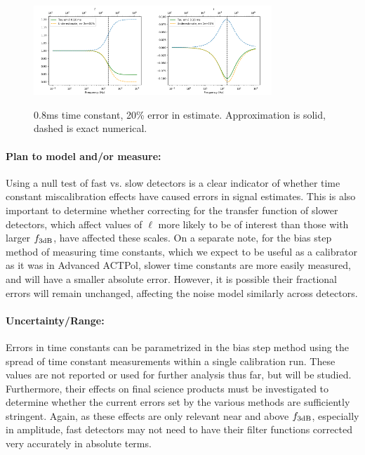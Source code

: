 \begin{figure}[h!]
\centering
\includegraphics[width=0.4\textwidth]{figures/tau_ampl_error_800us_20pError.png}\quad\includegraphics[width=0.4\textwidth]{figures/tau_phase_error_800us_20pError.png}
\caption{0.8ms time constant, 20\% error in estimate. Approximation is solid, dashed is exact numerical.}
\label{tau_miscal}
\end{figure}

\paragraph{Plan to model and/or measure:}
Using a null test of fast vs. slow detectors is a clear indicator of whether time constant miscalibration effects have caused errors in signal estimates. This is also important to determine whether correcting for the transfer function of slower detectors, which affect values of $\ell$ more likely to be of interest than those with larger $f_{\mbox{\scriptsize 3dB}}$, have affected these scales. On a separate note, for the bias step method of measuring time constants, which we expect to be useful as a calibrator as it was in Advanced ACTPol, slower time constants are more easily measured, and will have a smaller absolute error. However, it is possible their fractional errors will remain unchanged, affecting the noise model similarly across detectors.

\paragraph{Uncertainty/Range:}
Errors in time constants can be parametrized in the bias step method using the spread of time constant measurements within a single calibration run. These values are not reported or used for further analysis thus far, but will be studied. Furthermore, their effects on final science products must be investigated to determine whether the current errors set by the various methods are sufficiently stringent. Again, as these effects are only relevant near and above $f_{\mbox{\scriptsize 3dB}}$, especially in amplitude, fast detectors may not need to have their filter functions corrected very accurately in absolute terms.

